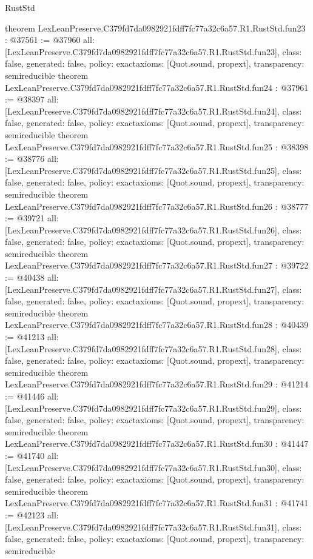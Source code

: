\begin{lexlean}{RustStd}
\begin{coremodule}
{}
theorem LexLeanPreserve.C379fd7da0982921fdff7fc77a32c6a57.R1.RustStd.fun23 : @37561 := @37960 {
  all: [LexLeanPreserve.C379fd7da0982921fdff7fc77a32c6a57.R1.RustStd.fun23],
  class: false,
  generated: false,
  policy: exact{axioms: [Quot.sound, propext]},
  transparency: semireducible
}
theorem LexLeanPreserve.C379fd7da0982921fdff7fc77a32c6a57.R1.RustStd.fun24 : @37961 := @38397 {
  all: [LexLeanPreserve.C379fd7da0982921fdff7fc77a32c6a57.R1.RustStd.fun24],
  class: false,
  generated: false,
  policy: exact{axioms: [Quot.sound, propext]},
  transparency: semireducible
}
theorem LexLeanPreserve.C379fd7da0982921fdff7fc77a32c6a57.R1.RustStd.fun25 : @38398 := @38776 {
  all: [LexLeanPreserve.C379fd7da0982921fdff7fc77a32c6a57.R1.RustStd.fun25],
  class: false,
  generated: false,
  policy: exact{axioms: [Quot.sound, propext]},
  transparency: semireducible
}
theorem LexLeanPreserve.C379fd7da0982921fdff7fc77a32c6a57.R1.RustStd.fun26 : @38777 := @39721 {
  all: [LexLeanPreserve.C379fd7da0982921fdff7fc77a32c6a57.R1.RustStd.fun26],
  class: false,
  generated: false,
  policy: exact{axioms: [Quot.sound, propext]},
  transparency: semireducible
}
theorem LexLeanPreserve.C379fd7da0982921fdff7fc77a32c6a57.R1.RustStd.fun27 : @39722 := @40438 {
  all: [LexLeanPreserve.C379fd7da0982921fdff7fc77a32c6a57.R1.RustStd.fun27],
  class: false,
  generated: false,
  policy: exact{axioms: [Quot.sound, propext]},
  transparency: semireducible
}
theorem LexLeanPreserve.C379fd7da0982921fdff7fc77a32c6a57.R1.RustStd.fun28 : @40439 := @41213 {
  all: [LexLeanPreserve.C379fd7da0982921fdff7fc77a32c6a57.R1.RustStd.fun28],
  class: false,
  generated: false,
  policy: exact{axioms: [Quot.sound, propext]},
  transparency: semireducible
}
theorem LexLeanPreserve.C379fd7da0982921fdff7fc77a32c6a57.R1.RustStd.fun29 : @41214 := @41446 {
  all: [LexLeanPreserve.C379fd7da0982921fdff7fc77a32c6a57.R1.RustStd.fun29],
  class: false,
  generated: false,
  policy: exact{axioms: [Quot.sound, propext]},
  transparency: semireducible
}
theorem LexLeanPreserve.C379fd7da0982921fdff7fc77a32c6a57.R1.RustStd.fun30 : @41447 := @41740 {
  all: [LexLeanPreserve.C379fd7da0982921fdff7fc77a32c6a57.R1.RustStd.fun30],
  class: false,
  generated: false,
  policy: exact{axioms: [Quot.sound, propext]},
  transparency: semireducible
}
theorem LexLeanPreserve.C379fd7da0982921fdff7fc77a32c6a57.R1.RustStd.fun31 : @41741 := @42123 {
  all: [LexLeanPreserve.C379fd7da0982921fdff7fc77a32c6a57.R1.RustStd.fun31],
  class: false,
  generated: false,
  policy: exact{axioms: [Quot.sound, propext]},
  transparency: semireducible
}
\end{coremodule}
\end{lexlean}
